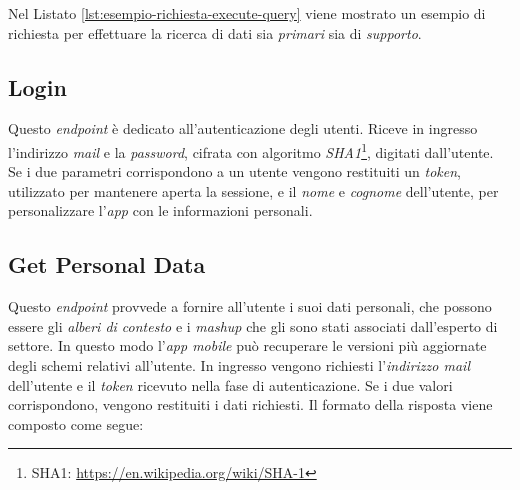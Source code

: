 Nel Listato \ref{lst:esempio-richiesta-execute-query} viene mostrato un esempio di richiesta per effettuare la ricerca di dati sia \emph{primari} sia di \emph{supporto}.

\subsection{Login\label{sec:login-endpoint}}

Questo \emph{endpoint} è dedicato all'autenticazione degli utenti. Riceve in ingresso l'indirizzo \emph{mail} e la \emph{password}, cifrata con algoritmo \emph{SHA1}\footnote{SHA1: \url{https://en.wikipedia.org/wiki/SHA-1}}, digitati dall'utente. Se i due parametri corrispondono a un utente vengono restituiti un \emph{token}, utilizzato per mantenere aperta la sessione, e il \emph{nome} e \emph{cognome} dell'utente, per personalizzare l'\emph{app} con le informazioni personali.

\subsection{Get Personal Data\label{sec:get-personal-data-endpoint}}

Questo \emph{endpoint} provvede a fornire all'utente i suoi dati personali, che possono essere gli \emph{alberi di contesto} e i \emph{mashup} che gli sono stati associati dall'esperto di settore. In questo modo l'\emph{app mobile} può recuperare le versioni più aggiornate degli schemi relativi all'utente. In ingresso vengono richiesti l'\emph{indirizzo mail} dell'utente e il \emph{token} ricevuto nella fase di autenticazione. Se i due valori corrispondono, vengono restituiti i dati richiesti. Il formato della risposta viene composto come segue:

